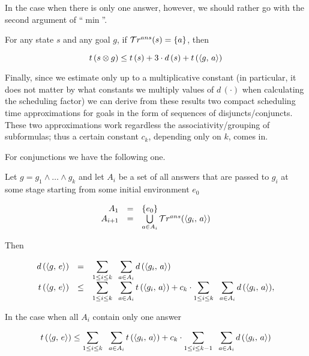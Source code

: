 In the case when there is only one answer, however, we should rather go with the second argument of ``$\min$''.

\begin{corollary}
\label{lem:prod_estimation_single_answer}
  For any state $s$ and any goal $g$, if $\mathcal{T}r^{ans}(s) = \{a\}$, then
  
\[ t\,(s \otimes g) \le t\,(s) + 3\cdot d\,(s) + t\,(\langle g ,\, a \rangle) \]
\end{corollary}

Finally, since we estimate only up to a multiplicative constant (in particular, it does not matter by what constants we multiply values of $d\,(\cdot)$ when calculating
the scheduling factor) we can derive from these results two compact scheduling time approximations for goals in the form of sequences of disjuncts/conjuncts.
These two approximations work regardless the associativity/grouping of subformulas; thus a certain constant $c_k$, depending only on $k$, comes in.

For conjunctions we have the following one.

\begin{lemma}
\label{lem:conjunction_metrics_calc}

Let $g = g_1 \land \dots \land g_k$ and let $A_i$ be a set of all answers that are passed to $g_i$ at some stage starting from some initial environment $e_0$

\[
\begin{array}{rcl}
A_1 &=& \{ e_0 \} \\
A_{i + 1} & = & \bigcup\limits_{a \in A_i} \mathcal{T}r^{ans}(\langle g_i ,\, a \rangle) 
\end{array}
\]

Then

\[
\begin{array}{rcl}
d\,(\langle g ,\, e \rangle) &=& \displaystyle\sum\limits_{1 \le i \le k} \;\; \displaystyle\sum\limits_{a \in A_i} d\,(\langle g_i ,\, a \rangle) \\
t\,(\langle g ,\, e \rangle) &\le& \displaystyle\sum\limits_{1 \le i \le k} \;\; \displaystyle\sum\limits_{a \in A_i} t\,(\langle g_i ,\, a \rangle) + c_k \cdot \displaystyle\sum\limits_{1 \le i \le k} \;\; \displaystyle\sum\limits_{a \in A_i} d\,(\langle g_i ,\, a \rangle), \\
\end{array}
\]

In the case when all $A_i$ contain only one answer

\[
t\,(\langle g ,\, e \rangle) \le \displaystyle\sum\limits_{1 \le i \le k} \;\; \displaystyle\sum\limits_{a \in A_i} t\,(\langle g_i ,\, a \rangle) + c_k \cdot \displaystyle \sum\limits_{1 \le i \le k - 1} \;\; \displaystyle\sum\limits_{a \in A_i} d\,(\langle g_i ,\, a \rangle)
\]

\end{lemma}

